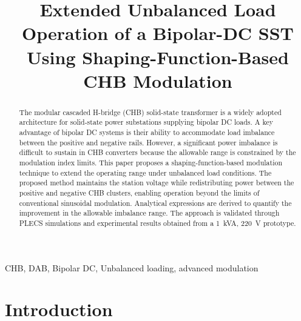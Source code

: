 \documentclass[conference]{IEEEtran}
\begin{document}
\title{Extended Unbalanced Load Operation of a Bipolar-DC SST Using Shaping-Function-Based CHB Modulation}

\author{
\and
{}
\and
{}
}

\maketitle

\begin{abstract}
The modular cascaded H-bridge (CHB) solid-state transformer is a widely adopted architecture for solid-state power substations supplying bipolar DC loads. A key advantage of bipolar DC systems is their ability to accommodate load imbalance between the positive and negative rails. However, a significant power imbalance is difficult to sustain in CHB converters because the allowable range is constrained by the modulation index limits. This paper proposes a shaping-function-based modulation technique to extend the operating range under unbalanced load conditions. The proposed method maintains the station voltage while redistributing power between the positive and negative CHB clusters, enabling operation beyond the limits of conventional sinusoidal modulation. Analytical expressions are derived to quantify the improvement in the allowable imbalance range. The approach is validated through PLECS simulations and experimental results obtained from a 1~kVA, 220~V prototype.
\end{abstract}

\begin{IEEEkeywords}
CHB, DAB, Bipolar DC, Unbalanced loading, advanced modulation
\end{IEEEkeywords}

\section{Introduction}
\label{sec: Intro}
\end{document}
